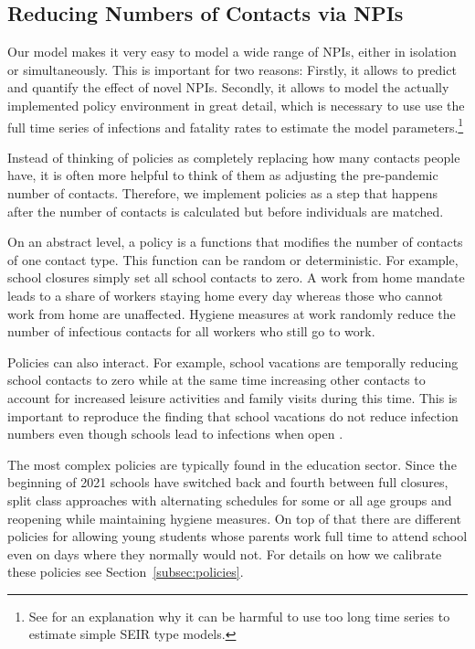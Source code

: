 \subsection{Reducing Numbers of Contacts via NPIs}
\label{sec:policies}

Our model makes it very easy to model a wide range of NPIs, either in isolation or
simultaneously. This is important for two reasons: Firstly, it allows to predict and
quantify the effect of novel NPIs. Secondly, it allows to model the actually implemented
policy environment in great detail, which is necessary to use use the full time series
of infections and fatality rates to estimate the model parameters.\footnote{
See \citet{Avery2020} for an explanation why it can be harmful to use too long time
series to estimate simple SEIR type models.}


Instead of thinking of policies as completely replacing how many contacts people have,
it is often more helpful to think of them as adjusting the pre-pandemic number of
contacts. Therefore, we implement policies as a step that happens after the number of contacts is
calculated but before individuals are matched.

On an abstract level, a policy is a functions that modifies the number of contacts of
one contact type. This function can be random or deterministic. For example, school
closures simply set all school contacts to zero. A work from home mandate leads to a
share of workers staying home every day whereas those who cannot work from home are
unaffected. Hygiene measures at work randomly reduce the number of infectious contacts
for all workers who still go to work.

Policies can also interact. For example, school vacations are temporally reducing school
contacts to zero while at the same time increasing other contacts to account for
increased leisure activities and family visits during this time. This is important to
reproduce the finding that school vacations do not reduce infection numbers even though
schools lead to infections when open \citep{Isphording2021}.

The most complex policies are typically found in the education sector. Since the
beginning of 2021 schools have switched back and fourth between full closures,
split class approaches with alternating schedules for some or all age groups and
reopening while maintaining hygiene measures. On top of that there are different
policies for allowing young students whose parents work full time to attend school
even on days where they normally would not. For details on how we calibrate these
policies see Section~\ref{subsec:policies}.

